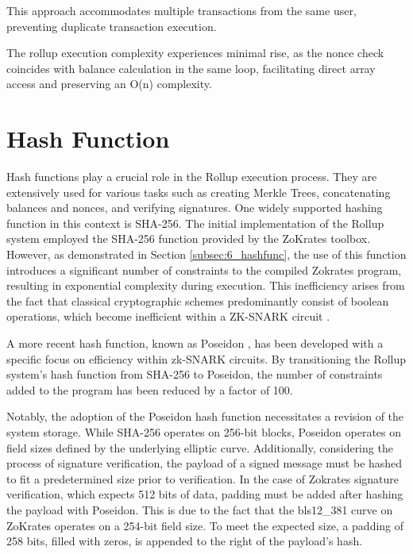 This approach accommodates multiple transactions from the same user, preventing duplicate transaction execution.

The rollup execution complexity experiences minimal rise, as the nonce check coincides with balance calculation in the same loop, facilitating direct array access and preserving an O(n) complexity.

\section{Hash Function}

Hash functions play a crucial role in the Rollup execution process. They are extensively used for various tasks such as creating Merkle Trees, concatenating balances and nonces, and verifying signatures. One widely supported hashing function in this context is SHA-256. The initial implementation of the Rollup system employed the SHA-256 function provided by the ZoKrates toolbox. However, as demonstrated in Section \ref{subsec:6_hashfunc}, the use of this function introduces a significant number of constraints to the compiled Zokrates program, resulting in exponential complexity during execution. This inefficiency arises from the fact that classical cryptographic schemes predominantly consist of boolean operations, which become inefficient within a ZK-SNARK circuit \cite{belles-munoz_twisted_2021}.

A more recent hash function, known as Poseidon \cite{grassi_poseidon_2021}, has been developed with a specific focus on efficiency within zk-SNARK circuits. By transitioning the Rollup system's hash function from SHA-256 to Poseidon, the number of constraints added to the program has been reduced by a factor of 100.

Notably, the adoption of the Poseidon hash function necessitates a revision of the system storage. While SHA-256 operates on 256-bit blocks, Poseidon operates on field sizes defined by the underlying elliptic curve. Additionally, considering the process of signature verification, the payload of a signed message must be hashed to fit a predetermined size prior to verification. In the case of Zokrates signature verification, which expects 512 bits of data, padding must be added after hashing the payload with Poseidon. This is due to the fact that the bls12\_381 curve on ZoKrates operates on a 254-bit field size. To meet the expected size, a padding of 258 bits, filled with zeros, is appended to the right of the payload's hash.

